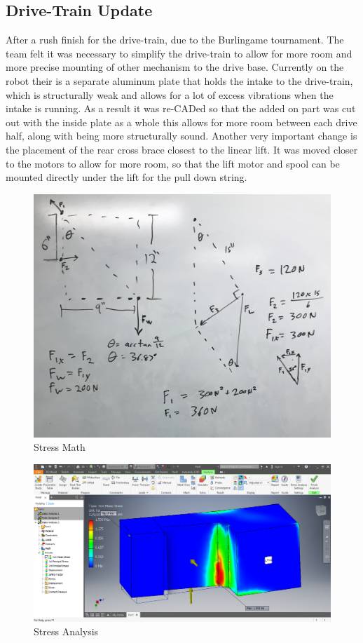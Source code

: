 \documentclass{article}
\begin{document}
\subsection{Drive-Train Update}
After a rush finish for the drive-train, due to the Burlingame tournament. The team felt it was necessary to simplify the drive-train to allow for more room and more precise mounting of other mechanism to the drive base. Currently on the robot their is a separate aluminum plate that holds the intake to the drive-train, which is structurally  weak and allows for a lot of excess vibrations when the intake is running. As a result it was re-CADed so that the added on part was cut out with the inside plate as a whole this allows for more room between each drive half, along with being more structurally sound. Another very important change is the placement of the rear cross brace closest to the linear lift. It was moved closer to the motors to allow for more room, so that the lift motor and spool can be mounted directly under the lift for the pull down string. 

\begin{figure}
    \centering
    \includegraphics[width=.6 \textwidth]{14_12-03/images/Math.jpg}
    \caption{Stress Math}
    \label{fig:math}
\end{figure}

\begin{figure}
    \centering
    \includegraphics[width=.6\textwidth]{14_12-03/images/Stress_Analysis.png}
    \caption{Stress Analysis}
    \label{fig:stress}
\end{figure}
\subsection{}
\end{document}

